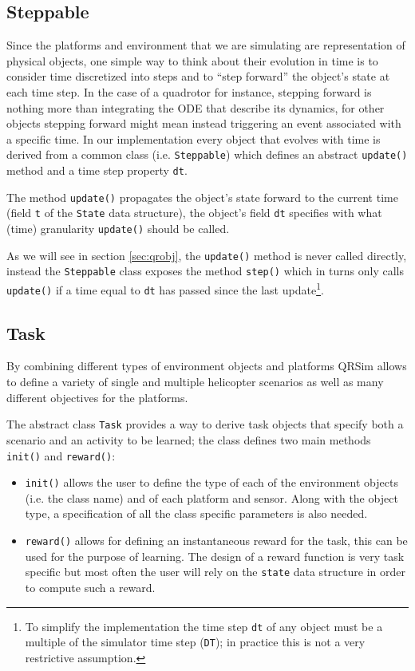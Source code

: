 \documentclass[a4paper,11pt]{report}
\newcommand{\sname}{QRSim\xspace}
\begin{document}
\subsection{Steppable}

Since the platforms and environment that we are simulating are representation of physical objects, one simple way to think about their evolution in time is to consider time discretized into steps and to ``step forward'' the object's state at each time step. In the case of a quadrotor for instance, stepping forward is nothing more than integrating the ODE that describe its dynamics, for other objects stepping forward might mean instead triggering an event associated with a specific time.
In our implementation every object that evolves with time is derived from a common class (i.e. \texttt{Steppable}) which defines an abstract \texttt{update()} method and a time step property \texttt{dt}.

The method \texttt{update()} propagates the object's state forward to the current time (field \texttt{t} of the \texttt{State} data structure), the object's field \texttt{dt} specifies with what (time) granularity \texttt{update()} should be called. 

As we will see in section \ref{sec:qrobj}, the \texttt{update()} method is never called directly, instead the  \texttt{Steppable} class exposes the method \texttt{step()} which in turns only calls \texttt{update()} if a time equal to \texttt{dt} has passed since the last update\footnote{To simplify the implementation the time step \texttt{dt} of any object must be a multiple of the simulator time step (\texttt{DT}); in practice this is not a very restrictive assumption.}.

\subsection{Task}

By combining different types of environment objects and platforms \sname allows to define a variety of single and multiple helicopter scenarios as well as many different objectives for the platforms.

The abstract class \texttt{Task} provides a way to derive task objects that specify both a scenario and an activity to be learned; the class defines two main methods \texttt{init()} and \texttt{reward()}:
\begin{itemize}
 \item \texttt{init()} allows the user to define the type of each of the environment objects (i.e. the class name) and of each platform and sensor. Along with the object type, a specification of all the class specific parameters is also needed.
 \item \texttt{reward()} allows for defining an instantaneous reward for the task, this can be used for the purpose of learning. The design of a reward function is very task specific but most often the user will rely on the \texttt{state} data structure in order to compute such a reward.
\end{itemize}
\end{document}

